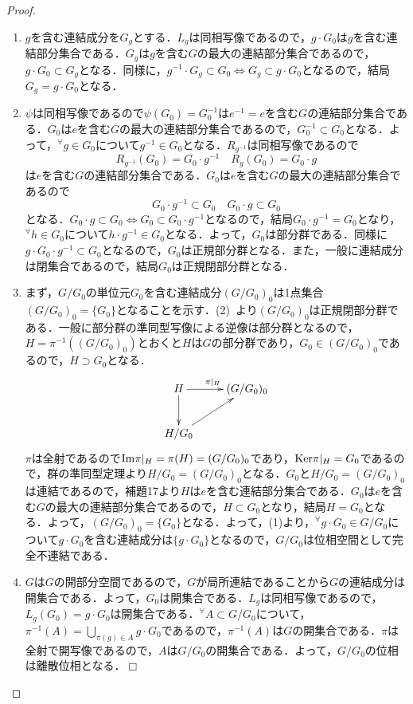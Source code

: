 \documentclass[a4paper,11pt]{jsarticle}
\newtheorem{proof}{証明}
\def\qed{\hfill $\Box$}
\begin{document}
\vspace{-0.7zh}%
\begin{proof}
\begin{enumerate}
\renewcommand{\labelenumi}{(\arabic{enumi})}
\item $g$を含む連結成分を$G_g$とする．$L_g$は同相写像であるので，$g\cdot G_0$は$g$を含む連結部分集合である．$G_g$は$g$を含む$G$の最大の連結部分集合であるので，$g\cdot G_0\subset G_g$となる．同様に，$g^{-1}\cdot G_g\subset G_0 \Longleftrightarrow G_g\subset g\cdot G_0$となるので，結局$G_g=g\cdot G_0$となる．
\item $\psi$は同相写像であるので$\psi(G_0)=G_0^{-1}$は$e^{-1}=e$を含む$G$の連結部分集合である．$G_0$は$e$を含む$G$の最大の連結部分集合であるので，$G_0^{-1}\subset G_0$となる．よって，$^\forall g\in G_0$について$g^{-1}\in G_0$となる．$R_{g^{-1}}$は同相写像であるので
\begin{equation*}
R_{g^{-1}}(G_0)=G_0\cdot g^{-1} \quad R_{g}(G_0)=G_0\cdot g
\end{equation*}
は$e$を含む$G$の連結部分集合である．$G_0$は$e$を含む$G$の最大の連結部分集合であるので
\begin{equation*}
G_0\cdot g^{-1}\subset G_0 \quad G_0\cdot g\subset G_0
\end{equation*}
となる．$G_0\cdot g\subset G_0 \Longleftrightarrow G_0\subset G_0\cdot g^{-1}$となるので，結局$G_0\cdot g^{-1}=G_0$となり，$^\forall h\in G_0$について$h\cdot g^{-1}\in G_0$となる．よって，$G_0$は部分群である．同様に$g\cdot G_0\cdot g^{-1}\subset G_0$となるので，$G_0$は正規部分群となる．また，一般に連結成分は閉集合であるので，結局$G_0$は正規閉部分群となる．
\item まず，$G/G_0$の単位元$G_0$を含む連結成分$(G/G_0)_0$は1点集合$(G/G_0)_0=\{G_0\}$となることを示す．(2){\ }より$(G/G_0)_0$は正規閉部分群である．一般に部分群の準同型写像による逆像は部分群となるので，$H=\pi^{-1}((G/G_0)_0)$とおくと$H$は$G$の部分群であり，$G_0\in (G/G_0)_0$であるので，$H\supset G_0$となる．
\begin{equation*}
\xymatrix{
H \ar[d]\ar[r]^{\pi|_H} & (G/G_0)_0 \\
H/G_0 \ar[ru]
}
\end{equation*}
$\pi$は全射であるので${\rm Im}\pi|_H=\pi(H)=(G/G_0)_0$であり，${\rm Ker}\pi|_H=G_0$であるので，群の準同型定理より$H/G_0=(G/G_0)_0$となる．$G_0$と$H/G_0=(G/G_0)_0$は連結であるので，補題17より$H$は$e$を含む連結部分集合である．$G_0$は$e$を含む$G$の最大の連結部分集合であるので，$H\subset G_0$となり，結局$H=G_0$となる．よって，$(G/G_0)_0=\{G_0\}$となる．よって，(1)より，$^\forall g\cdot G_0\in G/G_0$について$g\cdot G_0$を含む連結成分は$\{g\cdot G_0\}$となるので，$G/G_0$は位相空間として完全不連結である．
\item $G$は$G$の開部分空間であるので，$G$が局所連結であることから$G$の連結成分は開集合である．よって，$G_0$は開集合である．$L_g$は同相写像であるので，$L_g(G_0)=g\cdot G_0$は開集合である．$^\forall A\subset G/G_0$について，$\pi^{-1}(A)=\underset{\pi(g)\in A}{\bigcup}g\cdot G_0$であるので，$\pi^{-1}(A)$は$G$の開集合である．$\pi$は全射で開写像であるので，$A$は$G/G_0$の開集合である．よって，$G/G_0$の位相は離散位相となる．\qed
\end{enumerate}
\end{proof}
\end{document}
